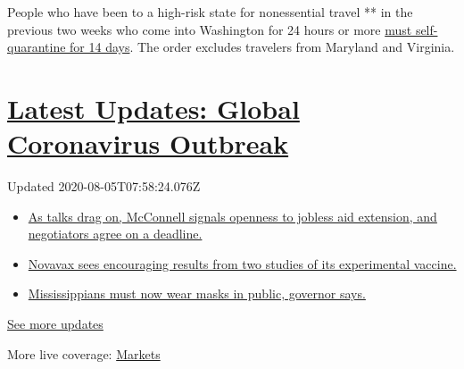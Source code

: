 People who have been to a high-risk state for nonessential travel ** in
the previous two weeks who come into Washington for 24 hours or more
\href{https://coronavirus.dc.gov/page/mayor’s-order-2020-081-requirement-self-quarantine-after-non-essential-travel-during-covid-19}{must
self-quarantine for 14 days}. The order excludes travelers from Maryland
and Virginia.

\hypertarget{latest-updates-global-coronavirus-outbreak}{%
\section{\texorpdfstring{\href{https://www.nytimes3xbfgragh.onion/2020/08/04/world/coronavirus-cases.html?action=click\&pgtype=Article\&state=default\&region=MAIN_CONTENT_1\&context=storylines_live_updates}{Latest
Updates: Global Coronavirus
Outbreak}}{Latest Updates: Global Coronavirus Outbreak}}\label{latest-updates-global-coronavirus-outbreak}}

Updated 2020-08-05T07:58:24.076Z

\begin{itemize}
\tightlist
\item
  \href{https://www.nytimes3xbfgragh.onion/2020/08/04/world/coronavirus-cases.html?action=click\&pgtype=Article\&state=default\&region=MAIN_CONTENT_1\&context=storylines_live_updates\#link-762df92}{As
  talks drag on, McConnell signals openness to jobless aid extension,
  and negotiators agree on a deadline.}
\item
  \href{https://www.nytimes3xbfgragh.onion/2020/08/04/world/coronavirus-cases.html?action=click\&pgtype=Article\&state=default\&region=MAIN_CONTENT_1\&context=storylines_live_updates\#link-1228a480}{Novavax
  sees encouraging results from two studies of its experimental
  vaccine.}
\item
  \href{https://www.nytimes3xbfgragh.onion/2020/08/04/world/coronavirus-cases.html?action=click\&pgtype=Article\&state=default\&region=MAIN_CONTENT_1\&context=storylines_live_updates\#link-794484ed}{Mississippians
  must now wear masks in public, governor says.}
\end{itemize}

\href{https://www.nytimes3xbfgragh.onion/2020/08/04/world/coronavirus-cases.html?action=click\&pgtype=Article\&state=default\&region=MAIN_CONTENT_1\&context=storylines_live_updates}{See
more updates}

More live coverage:
\href{https://www.nytimes3xbfgragh.onion/live/2020/08/04/business/stock-market-today-coronavirus?action=click\&pgtype=Article\&state=default\&region=MAIN_CONTENT_1\&context=storylines_live_updates}{Markets}


